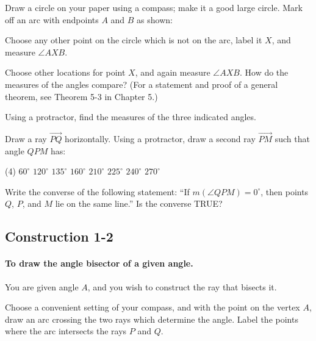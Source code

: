 \documentclass[12pt]{book} %
\begin{document}
\begin{ExerciseList}
	\Exercise Draw a circle on your paper using a compass; make it a good large circle. Mark off an arc with endpoints $A$ and $B$ as shown:
	
	
	Choose any other point on the circle which is not on the arc, label it $X$, and measure $\angle AXB$.
	
	
	Choose other locations for point $X$, and again measure $\angle AXB$. How do the measures of the angles compare? (For a statement and proof of a general theorem, see Theorem 5-3 in Chapter 5.)
	
	\Exercise Using a protractor, find the measures of the three indicated angles.
	
	
	\Exercise Draw a ray $\overrightarrow{PQ}$ horizontally. Using a protractor, draw a second ray $\overrightarrow{PM}$ such that angle $QPM$ has:
	\begin{tasks}(4)
		\task[(a)] $60^\circ$
		\task[(b)] $120^\circ$
		\task[(c)] $135^\circ$
		\task[(d)] $160^\circ$
		\task[(e)] $210^\circ$
		\task[(f)] $225^\circ$
		\task[(g)] $240^\circ$
		\task[(h)] $270^\circ$
	\end{tasks}
	
	\Exercise Write the converse of the following statement: ``If $m(\angle QPM)=0^\circ$, then points $Q$, $P$, and $M$ lie on the same line.'' Is the converse TRUE?
\end{ExerciseList}

\subsection*{Construction 1-2}

\paragraph{To draw the angle bisector of a given angle.}

You are given angle $A$, and you wish to construct the ray that bisects it.


Choose a convenient setting of your compass, and with the point on the vertex $A$, draw an arc crossing the two rays which determine the angle. Label the points where the arc intersects the rays $P$ and $Q$.

\end{document}
